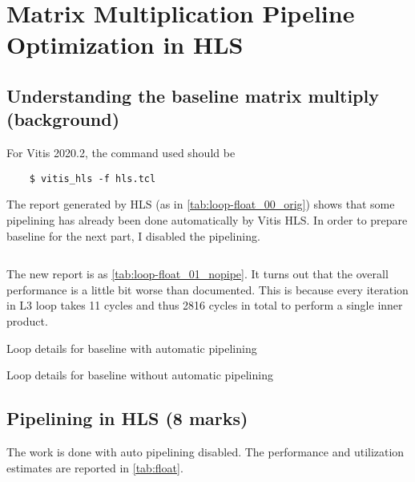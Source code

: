 \section{Matrix Multiplication Pipeline Optimization in HLS}

\subsection{Understanding the baseline matrix multiply (background)}\label{sec:1a}

For Vitis 2020.2, the command used should be
\begin{verbatim}
    $ vitis_hls -f hls.tcl
\end{verbatim}
The report generated by HLS (as in \autoref{tab:loop-float_00_orig}) shows that
some pipelining has already been done automatically by Vitis HLS.
In order to prepare baseline for the next part, I disabled the pipelining.

\inputminted{diff}{program/float_nopipe.diff}

The new report is as \autoref{tab:loop-float_01_nopipe}.
It turns out that the overall performance is a little bit worse than documented.
This is because every iteration in L3 loop takes 11 cycles and thus
2816 cycles in total to perform a single inner product.

\begin{table}
    \caption{Loop details for baseline with automatic pipelining}
    \label{tab:loop-float_00_orig}
    \centering
    
\end{table}

\begin{table}
    \caption{Loop details for baseline without automatic pipelining}
    \label{tab:loop-float_01_nopipe}
    \centering
    
\end{table}

\subsection{Pipelining in HLS (8 marks)}

The work is done with auto pipelining disabled.
The performance and utilization estimates are reported in \autoref{tab:float}.

